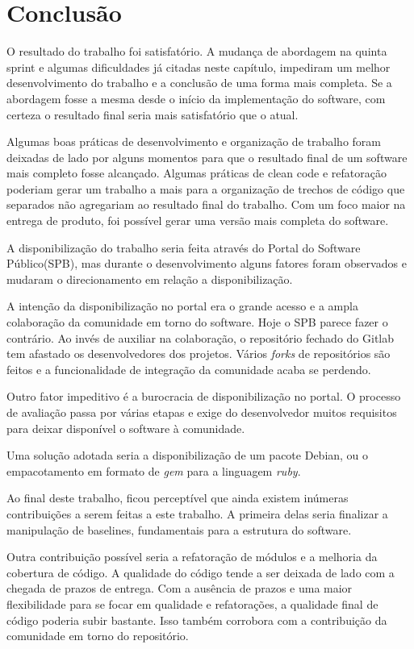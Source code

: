 \chapter[Conclusão]{Conclusão}

O resultado do trabalho foi satisfatório. A mudança de abordagem na quinta sprint e algumas dificuldades já citadas neste capítulo, impediram um melhor desenvolvimento do trabalho e a conclusão de uma forma mais completa. Se a abordagem fosse a mesma desde o início da implementação do software, com certeza o resultado final seria mais satisfatório que o atual.

Algumas boas práticas de desenvolvimento e organização de trabalho foram deixadas de lado por alguns momentos para que o resultado final de um software mais completo fosse alcançado. Algumas práticas de clean code e refatoração poderiam gerar um trabalho a mais para a organização de trechos de código que separados não agregariam ao resultado final do trabalho. Com um foco maior na entrega de produto, foi possível gerar uma versão mais completa do software.

A disponibilização do trabalho seria feita através do Portal do Software Público(SPB), mas durante o desenvolvimento alguns fatores foram observados e mudaram o direcionamento em relação a disponibilização.

A intenção da disponibilização no portal era o grande acesso e a ampla colaboração da comunidade em torno do software. Hoje o SPB parece fazer o contrário. Ao invés de auxiliar na colaboração, o repositório fechado do Gitlab tem afastado os desenvolvedores dos projetos. Vários \textit{forks} de repositórios são feitos e a funcionalidade de integração da comunidade acaba se perdendo.

Outro fator impeditivo é a burocracia de disponibilização no portal. O processo de avaliação passa por várias etapas e exige do desenvolvedor muitos requisitos para deixar disponível o software à comunidade.

Uma solução adotada seria a disponibilização de um pacote Debian, ou o empacotamento em formato de \textit{gem} para a linguagem \textit{ruby}.

Ao final deste trabalho, ficou perceptível que ainda existem inúmeras contribuições a serem feitas a este trabalho. A primeira delas seria finalizar a manipulação de baselines, fundamentais para a estrutura do software.

Outra contribuição possível seria a refatoração de módulos e a melhoria da cobertura de código. A qualidade do código tende a ser deixada de lado com a chegada de prazos de entrega. Com a ausência de prazos e uma maior flexibilidade para se focar em qualidade e refatorações, a qualidade final de código poderia subir bastante. Isso também corrobora com a contribuição da comunidade em torno do repositório.

